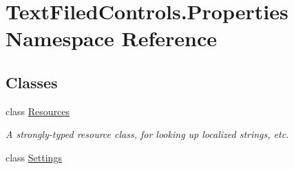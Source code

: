 \hypertarget{namespace_text_filed_controls_1_1_properties}{}\section{Text\+Filed\+Controls.\+Properties Namespace Reference}
\label{namespace_text_filed_controls_1_1_properties}
\subsection*{Classes}
\begin{DoxyCompactItemize}
\item 
class \mbox{\hyperlink{class_text_filed_controls_1_1_properties_1_1_resources}{Resources}}
\begin{DoxyCompactList}\small\item\em A strongly-\/typed resource class, for looking up localized strings, etc. \end{DoxyCompactList}\item 
class \mbox{\hyperlink{class_text_filed_controls_1_1_properties_1_1_settings}{Settings}}
\end{DoxyCompactItemize}
